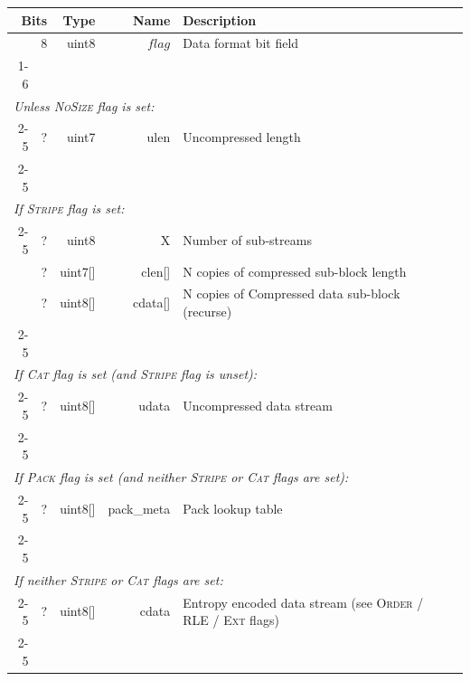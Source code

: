 \documentclass[a4paper]{article}
\begin{document}
\begin{table}[h]
\centering
\begin{tabular}{|r|r|r|r|p{9cm}|l|}
\hline
\multicolumn{2}{|r|}{\textbf{Bits} } & \textbf{Type}  & \textbf{Name} & \multicolumn{2}{p{9cm}|}{\textbf{Description}} \\
\hline
\multicolumn{2}{|r|}{8} & uint8 & $flag$ & \multicolumn{2}{p{9cm}|}{Data format bit field}\\
\cline{1-6}

\multicolumn{6}{|l|}{}\\[-0.3em]
\multicolumn{6}{|l|}{\textit{Unless \textsc{NoSize} flag is set:} } \\
\cline{2-5}
& ? & uint7 & ulen & Uncompressed length & \\
\cline{2-5}

\multicolumn{6}{|l|}{}\\[-0.3em]
\multicolumn{6}{|l|}{\textit{If \textsc{Stripe} flag is set:} } \\
\cline{2-5}
& ? & uint8 & X & Number of sub-streams & \\
& ? & uint7[] & clen[] & N copies of compressed sub-block length & \\
& ? & uint8[] & cdata[] & N copies of Compressed data sub-block (recurse) & \\
\cline{2-5}

\multicolumn{6}{|l|}{}\\[-0.7em]
\multicolumn{6}{|l|}{\textit{If \textsc{Cat} flag is set (and \textsc{Stripe} flag is unset):} } \\
\cline{2-5}
& ? & uint8[] & udata & Uncompressed data stream & \\
\cline{2-5}

\multicolumn{6}{|l|}{}\\[-0.7em]
\multicolumn{6}{|l|}{\textit{If \textsc{Pack} flag is set (and neither \textsc{Stripe} or \textsc{Cat} flags are set):} } \\
\cline{2-5}
& ? & uint8[] & pack\_meta & Pack lookup table & \\
\cline{2-5}

\multicolumn{6}{|l|}{}\\[-0.7em]
\multicolumn{6}{|l|}{\textit{If neither \textsc{Stripe} or \textsc{Cat} flags are set:} } \\
\cline{2-5}
& ? & uint8[] & cdata & Entropy encoded data stream (see \textsc{Order} / \textsc{RLE} / \textsc{Ext} flags) & \\
\cline{2-5}
\multicolumn{6}{|l|}{}\\
\hline
\end{tabular}
\end{table}
\end{document}
